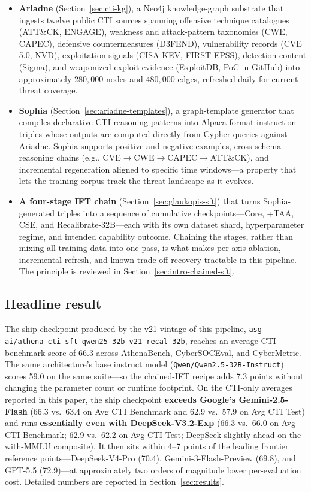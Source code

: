 \documentclass[conference]{IEEEtran}
\providecommand{\hfid}[1]{{\small\nolinkurl{#1}}}
\begin{document}
\begin{itemize}
  \item \textbf{Ariadne} (Section~\ref{sec:cti-kg}), a Neo4j knowledge-graph substrate that ingests twelve public CTI sources spanning offensive technique catalogues (ATT\&CK, ENGAGE), weakness and attack-pattern taxonomies (CWE, CAPEC), defensive countermeasures (D3FEND), vulnerability records (CVE 5.0, NVD), exploitation signals (CISA KEV, FIRST EPSS), detection content (Sigma), and weaponized-exploit evidence (ExploitDB, PoC-in-GitHub) into approximately $280{,}000$ nodes and $480{,}000$ edges, refreshed daily for current-threat coverage.

  \item \textbf{Sophia} (Section~\ref{sec:ariadne-templates}), a graph-template generator that compiles declarative CTI reasoning patterns into Alpaca-format instruction triples whose outputs are computed directly from Cypher queries against Ariadne. Sophia supports positive and negative examples, cross-schema reasoning chains (e.g., CVE$\to$CWE$\to$CAPEC$\to$ATT\&CK), and incremental regeneration aligned to specific time windows---a property that lets the training corpus track the threat landscape as it evolves.

  \item \textbf{A four-stage IFT chain} (Section~\ref{sec:glaukopis-sft}) that turns Sophia-generated triples into a sequence of cumulative checkpoints---Core, +TAA, CSE, and Recalibrate-32B---each with its own dataset shard, hyperparameter regime, and intended capability outcome. Chaining the stages, rather than mixing all training data into one pass, is what makes per-axis ablation, incremental refresh, and known-trade-off recovery tractable in this pipeline. The principle is reviewed in Section~\ref{sec:intro-chained-sft}.
\end{itemize}

\subsection{Headline result}
\label{sec:intro-headline-result}
The ship checkpoint produced by the v21 vintage of this pipeline, \hfid{asg-ai/athena-cti-sft-qwen25-32b-v21-recal-32b}, reaches an average CTI-benchmark score of 66.3 across AthenaBench, CyberSOCEval, and CyberMetric. The same architecture's base instruct model (\hfid{Qwen/Qwen2.5-32B-Instruct}) scores 59.0 on the same suite---so the chained-IFT recipe adds 7.3 points without changing the parameter count or runtime footprint. On the CTI-only averages reported in this paper, the ship checkpoint \textbf{exceeds Google's Gemini-2.5-Flash} (66.3 vs.\ 63.4 on Avg CTI Benchmark and 62.9 vs.\ 57.9 on Avg CTI Test) and runs \textbf{essentially even with DeepSeek-V3.2-Exp} (66.3 vs.\ 66.0 on Avg CTI Benchmark; 62.9 vs.\ 62.2 on Avg CTI Test; DeepSeek slightly ahead on the with-MMLU composite). It then sits within 4--7 points of the leading frontier reference points---DeepSeek-V4-Pro (70.4), Gemini-3-Flash-Preview (69.8), and GPT-5.5 (72.9)---at approximately two orders of magnitude lower per-evaluation cost. Detailed numbers are reported in Section~\ref{sec:results}.
\end{document}
